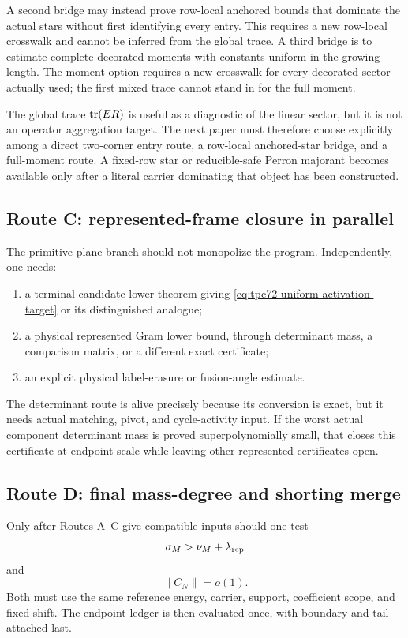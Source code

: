 A second bridge may instead prove row-local anchored bounds that dominate
the actual stars without first identifying every entry.  This requires a
new row-local crosswalk and cannot be inferred from the global trace.
A third bridge is to estimate complete decorated moments with constants
uniform in the growing length.  The moment option requires a new crosswalk
for every decorated sector actually used; the first mixed trace cannot
stand in for the full moment.

The global trace \(\operatorname{tr}(ER)\) is useful as a diagnostic of the linear sector,
but it is not an operator aggregation target.  The next paper must therefore
choose explicitly among a direct two-corner entry route, a row-local
anchored-star bridge, and a full-moment route.  A fixed-row star or
reducible-safe Perron majorant becomes available only after a literal
carrier dominating that object has been constructed.

\subsection{Route C: represented-frame closure in parallel}

The primitive-plane branch should not monopolize the program.  Independently,
one needs:
\begin{enumerate}[label=\textup{(R\arabic*)},leftmargin=3.6em]
 \item a terminal-candidate lower theorem giving
       \eqref{eq:tpc72-uniform-activation-target} or its distinguished
       analogue;
 \item a physical represented Gram lower bound, through determinant mass,
       a comparison matrix, or a different exact certificate;
 \item an explicit physical label-erasure or fusion-angle estimate.
\end{enumerate}
The determinant route is alive precisely because its conversion is exact,
but it needs actual matching, pivot, and cycle-activity input.  If the worst
actual component determinant mass is proved superpolynomially small, that
closes this certificate at endpoint scale while leaving other represented
certificates open.

\subsection{Route D: final mass-degree and shorting merge}

Only after Routes A--C give compatible inputs should one test
\begin{equation}
 \sigma_M>\nu_M+\lambda_{\rm rep}
 \label{eq:tpc72-final-mass-degree}
\end{equation}
and
\begin{equation}
 \|C_N\|=o(1).
 \label{eq:tpc72-final-nuisance}
\end{equation}
Both must use the same reference energy, carrier, support, coefficient
scope, and fixed shift.  The endpoint ledger is then evaluated once, with
boundary and tail attached last.

